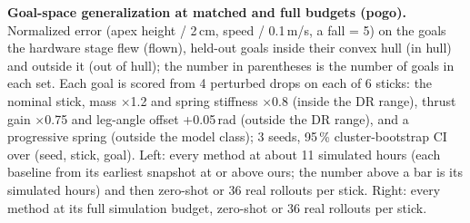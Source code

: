 \caption{\textbf{Goal-space generalization at matched and full budgets (pogo).} Normalized error (apex height / 2\,cm,
speed / 0.1\,m/s, a fall = 5) on the goals the hardware stage flew (flown), held-out goals inside their convex hull
(in hull) and outside it (out of hull); the number in parentheses is the number of goals in each set. Each goal is
scored from 4 perturbed drops on each of 6 sticks: the nominal stick, mass $\times$1.2 and spring stiffness
$\times$0.8 (inside the DR range), thrust gain $\times$0.75 and leg-angle offset +0.05\,rad (outside the DR range),
and a progressive spring (outside the model class); 3 seeds, 95\,\% cluster-bootstrap CI over (seed, stick, goal).
Left: every method at about 11 simulated hours (each baseline from its earliest snapshot at or above ours; the
number above a bar is its simulated hours) and then zero-shot or 36 real rollouts per stick. Right: every method at its
full simulation budget, zero-shot or 36 real rollouts per stick.}
